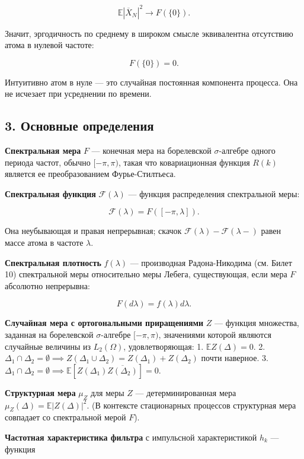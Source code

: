 \documentclass[
  11pt,
  a4paper,
]{article}
\begin{document}
\[
\mathbb E|\overline X_N|^2 \to F(\{0\}).
\]

Значит, эргодичность по среднему в широком смысле эквивалентна
отсутствию атома в нулевой частоте:

\[
F(\{0\})=0.
\]

Интуитивно атом в нуле --- это случайная постоянная компонента процесса.
Она не исчезает при усреднении по времени.

\subsection{3. Основные
определения}\label{ux43eux441ux43dux43eux432ux43dux44bux435-ux43eux43fux440ux435ux434ux435ux43bux435ux43dux438ux44f}

\textbf{Спектральная мера} \(F\) --- конечная мера на борелевской
\(\sigma\)-алгебре одного периода частот, обычно \([-\pi, \pi)\), такая
что ковариационная функция \(R(k)\) является ее преобразованием
Фурье-Стилтьеса.

\textbf{Спектральная функция} \(\mathcal F(\lambda)\) --- функция
распределения спектральной меры:

\[
\mathcal F(\lambda)=F([-\pi,\lambda]).
\]

Она неубывающая и правая непрерывная; скачок
\(\mathcal F(\lambda)-\mathcal F(\lambda-)\) равен массе атома в частоте
\(\lambda\).

\textbf{Спектральная плотность} \(f(\lambda)\) --- производная
Радона-Никодима (см. Билет 10) спектральной меры относительно меры
Лебега, существующая, если мера \(F\) абсолютно непрерывна:

\[
F(d\lambda) = f(\lambda) d\lambda.
\]

\textbf{Случайная мера с ортогональными приращениями} \(Z\) --- функция
множества, заданная на борелевской \(\sigma\)-алгебре \([-\pi, \pi)\),
значениями которой являются случайные величины из \(L_2(\Omega)\),
удовлетворяющая: 1. \(\mathbb E Z(\Delta) = 0\). 2.
\(\Delta_1 \cap \Delta_2 = \emptyset \implies Z(\Delta_1 \cup \Delta_2) = Z(\Delta_1) + Z(\Delta_2)\)
почти наверное. 3.
\(\Delta_1 \cap \Delta_2 = \emptyset \implies \mathbb E[Z(\Delta_1) \overline{Z(\Delta_2)}] = 0\).

\textbf{Структурная мера} \(\mu_Z\) для меры \(Z\) --- детерминированная
мера \(\mu_Z(\Delta) = \mathbb E|Z(\Delta)|^2\). (В контексте
стационарных процессов структурная мера совпадает со спектральной мерой
\(F\)).

\textbf{Частотная характеристика фильтра} с импульсной характеристикой
\(h_k\) --- функция
\end{document}
